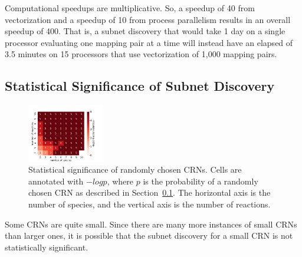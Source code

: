 \documentclass[webpdf,contemporary,large]{oup-authoring-template}
\newcommand{\secref}[1]{Section~\ref{#1}}
\theoremstyle{thmstyleone}%
\theoremstyle{thmstyletwo}%
\theoremstyle{thmstylethree}%
\begin{document}
Computational speedups are multiplicative.
So, a speedup of 40 from vectorization and a speedup of 10 from process parallelism results in an overall speedup of 400.
That is, a subnet discovery that would take 1 day on a single processor evaluating one mapping pair at a time will instead have an elapsed of 3.5 minutes on 15 processors that use vectorization of 1,000 mapping pairs.

\subsection{Statistical Significance of Subnet Discovery}\label{sec:significance}

\begin{figure}
\centering
\includegraphics[width=0.3\textwidth, angle=0]{figures/poc_random_benchmark.pdf}
\caption{Statistical significance of randomly chosen CRNs.
Cells are annotated with $-log p$, where $p$ is the probability of a randomly chosen CRN as described in \secref{sec:significance}. The horizontal axis is the number of species, and the vertical axis is the number of reactions.
}
\label{fig:statistical-significance}
\end{figure}
Some CRNs are quite small. Since there are many more instances of small CRNs than larger ones, it is possible that the subnet discovery for a small CRN is not statistically significant.

\end{document}
